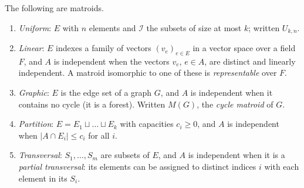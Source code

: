 \begin{proposition}\label{prop:examples}
The following are matroids.
\begin{enumerate}[label=(\alph*)]
\item \emph{Uniform}: $E$ with $n$ elements and $\mathcal I$ the subsets of size at most $k$; written $U_{k,n}$.
\item \emph{Linear}: $E$ indexes a family of vectors $(v_e)_{e\in E}$ in a vector space over a field $F$, and $A$ is independent when the vectors $v_e$, $e\in A$, are
distinct and linearly independent. A matroid isomorphic to one of these is \emph{representable} over $F$.
\item \emph{Graphic}: $E$ is the edge set of a graph $G$, and $A$ is independent when it contains no cycle (it is a forest). Written $M(G)$, the \emph{cycle matroid} of $G$.
\item \emph{Partition}: $E=E_1\sqcup\dots\sqcup E_k$ with capacities $c_i\ge0$, and $A$ is independent when $|A\cap E_i|\le c_i$ for all $i$.
\item \emph{Transversal}: $S_1,\dots,S_m$ are subsets of $E$, and $A$ is independent when it is a \emph{partial transversal}: its elements can be assigned to distinct indices $i$ with
each element in its $S_i$.
\end{enumerate}
\end{proposition}
